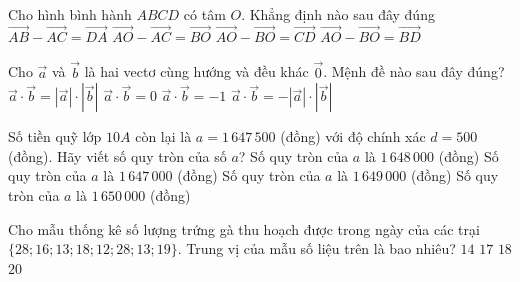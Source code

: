 \begin{ex}%
	Cho hình bình hành $ABCD$ có tâm $O$. Khẳng định nào sau đây đúng
	\choice
	{\True $\vec{AB}-\vec{AC}=\vec{DA}$}
	{$\vec{AO}-\vec{AC}=\vec{BO}$}
	{$\vec{AO}-\vec{BO}=\vec{CD}$}
	{$\vec{AO}-\vec{BO}=\vec{BD}$}
\end{ex}

\begin{ex}%
	Cho $\vec{a}$ và $\vec{b}$ là hai vectơ cùng hướng và đều khác $\vec{0}$. Mệnh đề nào sau đây đúng?
	\choice
	{\True $\vec{a} \cdot \vec{b}=\left|\vec{a}\right|\cdot\left|\vec{b}\right|$}
	{$\vec{a}\cdot\vec{b}=0$}
	{$\vec{a}\cdot\vec{b}=-1$}
	{$\vec{a} \cdot \vec{b}=-\left|\vec{a}\right|\cdot\left|\vec{b}\right|$}
\end{ex}

\begin{ex}%
		Số tiền quỹ lớp $10A$ còn lại là $a=1\,647\,500$ (đồng) với độ chính xác $d=500$ (đồng). Hãy viết số quy tròn của số $a$?
		\choice
		{\True Số quy tròn của $a$ là $1\,648\,000$ (đồng)}
		{Số quy tròn của $a$ là $1\,647\,000$ (đồng)}
		{Số quy tròn của $a$ là $1\,649\,000$ (đồng)}
		{Số quy tròn của $a$ là $1\,650\,000$ (đồng)}
\end{ex}

\begin{ex}%
	Cho mẫu thống kê số lượng trứng gà thu hoạch được trong ngày của các trại $\{28;16;13;18;12;28;13;19\}$. Trung vị của mẫu số liệu trên là bao nhiêu?
	\choice
	{$14$}
	{\True $17$}
	{$18$}
	{$20$}
\end{ex}

